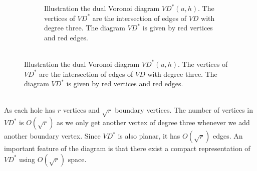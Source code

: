 \begin{figure}
\begin{subfigure}[b]{0.45\textwidth}
    \caption{Illustration the dual Voronoi diagram $VD^*(u,h)$. The vertices of
      $VD^*$ are the intersection of edges of $VD$ with degree three. The diagram $VD^*$
    is given by red vertices and red edges.\\ \\}
    \label{awvd2}
  \end{subfigure}
  \label{awvd}
\end{figure}
As each hole has $r$ vertices and
$\sqrt{r}$ boundary vertices. The number of vertices in $VD^*$ is $O(\sqrt{r})$ as we
only get another vertex of degree three whenever we add another boundary vertex. Since
$VD^*$ is also planar, it has $O(\sqrt{r})$ edges. An important
feature of the diagram is that there exist a compact representation of $VD^*$ using $O(\sqrt{r})$ space.
